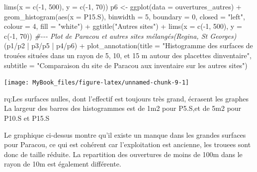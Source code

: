 \documentclass[
  12pt,
  american,
  a4paper,
  extrafontsizes,onecolumn,openright
  ]{memoir}
\newenvironment{Shaded}{\begin{snugshade}}{\end{snugshade}}
\newcommand{\AttributeTok}[1]{\textcolor[rgb]{0.77,0.63,0.00}{#1}}
\newcommand{\CommentTok}[1]{\textcolor[rgb]{0.56,0.35,0.01}{\textit{#1}}}
\newcommand{\DecValTok}[1]{\textcolor[rgb]{0.00,0.00,0.81}{#1}}
\newcommand{\FunctionTok}[1]{\textcolor[rgb]{0.00,0.00,0.00}{#1}}
\newcommand{\NormalTok}[1]{#1}
\newcommand{\OtherTok}[1]{\textcolor[rgb]{0.56,0.35,0.01}{#1}}
\newcommand{\SpecialCharTok}[1]{\textcolor[rgb]{0.00,0.00,0.00}{#1}}
\newcommand{\StringTok}[1]{\textcolor[rgb]{0.31,0.60,0.02}{#1}}
\newlength{\rf}
\begin{document}
\begin{Shaded}
\begin{Highlighting}[]
    \FunctionTok{lims}\NormalTok{(}\AttributeTok{x =} \FunctionTok{c}\NormalTok{(}\SpecialCharTok{{-}}\DecValTok{1}\NormalTok{, }\DecValTok{500}\NormalTok{), }\AttributeTok{y =} \FunctionTok{c}\NormalTok{(}\SpecialCharTok{{-}}\DecValTok{1}\NormalTok{, }\DecValTok{70}\NormalTok{))}
\NormalTok{p6 }\OtherTok{\textless{}{-}} \FunctionTok{ggplot}\NormalTok{(}\AttributeTok{data =}\NormalTok{ ouvertures\_autres) }\SpecialCharTok{+} \FunctionTok{geom\_histogram}\NormalTok{(}\FunctionTok{aes}\NormalTok{(}\AttributeTok{x =}\NormalTok{ P15.S),}
    \AttributeTok{binwidth =} \DecValTok{5}\NormalTok{, }\AttributeTok{boundary =} \DecValTok{0}\NormalTok{, }\AttributeTok{closed =} \StringTok{"left"}\NormalTok{, }\AttributeTok{colour =} \DecValTok{4}\NormalTok{,}
    \AttributeTok{fill =} \StringTok{"white"}\NormalTok{) }\SpecialCharTok{+} \FunctionTok{ggtitle}\NormalTok{(}\StringTok{"Autres sites"}\NormalTok{) }\SpecialCharTok{+} \FunctionTok{lims}\NormalTok{(}\AttributeTok{x =} \FunctionTok{c}\NormalTok{(}\SpecialCharTok{{-}}\DecValTok{1}\NormalTok{,}
    \DecValTok{500}\NormalTok{), }\AttributeTok{y =} \FunctionTok{c}\NormalTok{(}\SpecialCharTok{{-}}\DecValTok{1}\NormalTok{, }\DecValTok{70}\NormalTok{))}
\CommentTok{\#{-}{-}{-} Plot de Paracou et autres sites mélangés(Regina, St Georges)}
\NormalTok{(p1}\SpecialCharTok{/}\NormalTok{p2 }\SpecialCharTok{|}\NormalTok{ p3}\SpecialCharTok{/}\NormalTok{p5 }\SpecialCharTok{|}\NormalTok{ p4}\SpecialCharTok{/}\NormalTok{p6) }\SpecialCharTok{+} \FunctionTok{plot\_annotation}\NormalTok{(}\AttributeTok{title =} \StringTok{"Histogramme des surfaces de trouées situées dans un rayon de 5, 10, et 15 m autour des placettes d\textquotesingle{}inventaire"}\NormalTok{,}
    \AttributeTok{subtitle =} \StringTok{"Comparaison du site de Paracou aux inventaire sur les autres sites"}\NormalTok{)}
\end{Highlighting}
\end{Shaded}

\begin{center}\texttt{[image: MyBook\_files/figure-latex/unnamed-chunk-9-1]} \end{center}

\normalsize
rq:Les surfaces nulles, dont l'effectif est toujours très grand, écrasent les graphes
La largeur des barres des histogrammes est de 1m2 pour P5.S,et de 5m2 pour P10.S et P15.S

Le graphique ci-dessus montre qu'il existe un manque dans les grandes surfaces pour Paracou, ce qui est cohérent car l'exploitation est ancienne, les trouees sont donc de taille réduite.
La repartition des ouvertures de moins de 100m dans le rayon de 10m est également différente.
\end{document}
